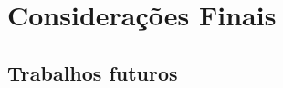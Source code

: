 \chapter{Considerações Finais}


\hspace{2.5cm}
\section{Trabalhos futuros}
\label{subsec:telas}
\hspace{2.5cm}

